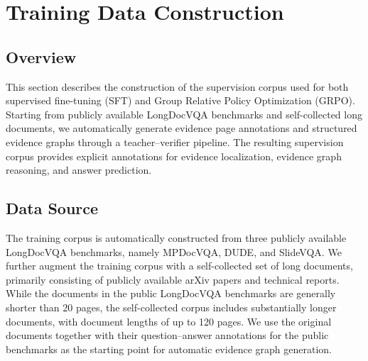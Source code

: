 \documentclass[letterpaper]{article} %
\begin{document}


\section{Training Data Construction}

\subsection{Overview}

This section describes the construction of the supervision corpus used for both supervised fine-tuning (SFT) and Group Relative Policy Optimization (GRPO). Starting from publicly available LongDocVQA benchmarks and self-collected long documents, we automatically generate evidence page annotations and structured evidence graphs through a teacher--verifier pipeline. The resulting supervision corpus provides explicit annotations for evidence localization, evidence graph reasoning, and answer prediction.


\subsection{Data Source}

The training corpus is automatically constructed from three publicly available LongDocVQA benchmarks, namely MPDocVQA, DUDE, and SlideVQA. We further augment the training corpus with a self-collected set of long documents, primarily consisting of publicly available arXiv papers and technical reports. While the documents in the public LongDocVQA benchmarks are generally shorter than 20 pages, the self-collected corpus includes substantially longer documents, with document lengths of up to 120 pages. We use the original documents together with their question--answer annotations for the public benchmarks as the starting point for automatic evidence graph generation.
\end{document}
